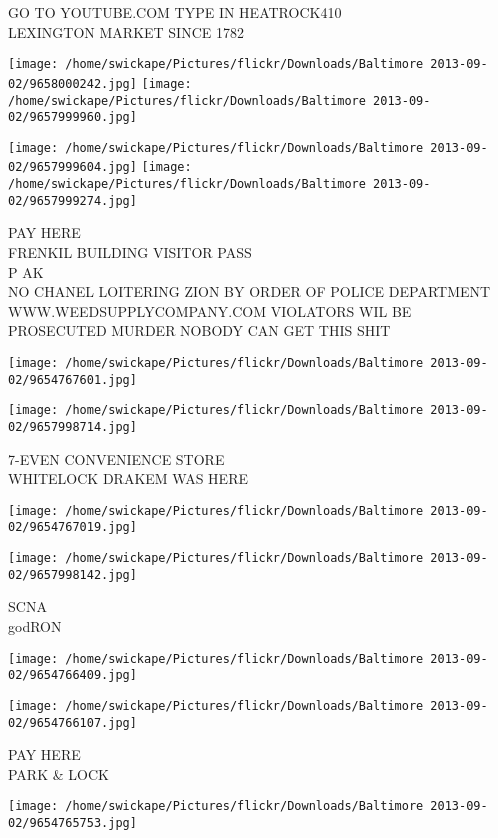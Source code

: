 \documentclass[10pt,letterpaper]{article}
\begin{document}
GO TO YOUTUBE.COM TYPE IN HEATROCK410\\
LEXINGTON MARKET SINCE 1782
\pagebreak

\texttt{[image: /home/swickape/Pictures/flickr/Downloads/Baltimore 2013-09-02/9658000242.jpg]}
\texttt{[image: /home/swickape/Pictures/flickr/Downloads/Baltimore 2013-09-02/9657999960.jpg]}

\texttt{[image: /home/swickape/Pictures/flickr/Downloads/Baltimore 2013-09-02/9657999604.jpg]}
\texttt{[image: /home/swickape/Pictures/flickr/Downloads/Baltimore 2013-09-02/9657999274.jpg]}

PAY HERE\\
FRENKIL BUILDING VISITOR PASS\\
P AK\\
NO CHANEL LOITERING ZION BY ORDER OF POLICE DEPARTMENT WWW.WEEDSUPPLYCOMPANY.COM VIOLATORS WIL BE PROSECUTED MURDER NOBODY CAN GET THIS SHIT
\pagebreak

\texttt{[image: /home/swickape/Pictures/flickr/Downloads/Baltimore 2013-09-02/9654767601.jpg]}

\vspace{0.25in}
\texttt{[image: /home/swickape/Pictures/flickr/Downloads/Baltimore 2013-09-02/9657998714.jpg]}

7{-}EVEN CONVENIENCE STORE\\
WHITELOCK DRAKEM WAS HERE
\pagebreak

\texttt{[image: /home/swickape/Pictures/flickr/Downloads/Baltimore 2013-09-02/9654767019.jpg]}

\vspace{0.25in}
\texttt{[image: /home/swickape/Pictures/flickr/Downloads/Baltimore 2013-09-02/9657998142.jpg]}

SCNA\\
godRON
\pagebreak

\texttt{[image: /home/swickape/Pictures/flickr/Downloads/Baltimore 2013-09-02/9654766409.jpg]}

\vspace{0.25in}
\texttt{[image: /home/swickape/Pictures/flickr/Downloads/Baltimore 2013-09-02/9654766107.jpg]}

PAY HERE\\
PARK \& LOCK
\pagebreak

\texttt{[image: /home/swickape/Pictures/flickr/Downloads/Baltimore 2013-09-02/9654765753.jpg]}
\end{document}
